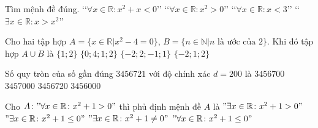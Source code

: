 \begin{ex}%
	Tìm mệnh đề đúng.
	\choice
	{\lq\lq$\forall x \in \mathbb{R}\colon x^2 + x < 0$\rq\rq}
	{\lq\lq$\forall x \in\mathbb{R}\colon x^2 > 0$\rq\rq}
	{\lq\lq$\forall x \in \mathbb{R}\colon x < 3$\rq\rq}
	{\True \lq\lq$\exists x \in \mathbb{R}\colon x > x^2$\rq\rq}
\end{ex}

\begin{ex}%
	Cho hai tập hợp $A=\{ x \in \mathbb{R}| x^2-4=0 \}$, $B=\{n \in \mathbb{N}| n \text{ là ước của } 2\}$. Khi đó tập hợp $A\cup B$ là
	\choice
	{$\{1;2\}$}
	{$\{0;4;1;2\}$}
	{$\{-2;2;-1;1\}$}
	{\True $\{-2;1;2\}$}
\end{ex}

\begin{ex}%
	Số quy tròn của số gần đúng $3456721$ với độ chính xác $d= 200$ là  
	\choice
	{$3456700$}
	{\True $3457000$}
	{$3456720$}
	{$3456000$}
\end{ex}

\begin{ex}%
	Cho $A\colon "\forall x \in \mathbb{R}\colon x^2 + 1 > 0"$ thì phủ định mệnh đề $A$ là
	\choice
	{$"\exists x \in \mathbb{R}\colon x^2 + 1 > 0"$}
	{\True $"\exists x \in \mathbb{R}\colon x^2 + 1 \le 0"$}
	{$"\exists x \in \mathbb{R}\colon x^2 + 1 \ne 0"$}
	{$"\forall x \in \mathbb{R}\colon x^2 + 1 \le 0"$}
\end{ex}

